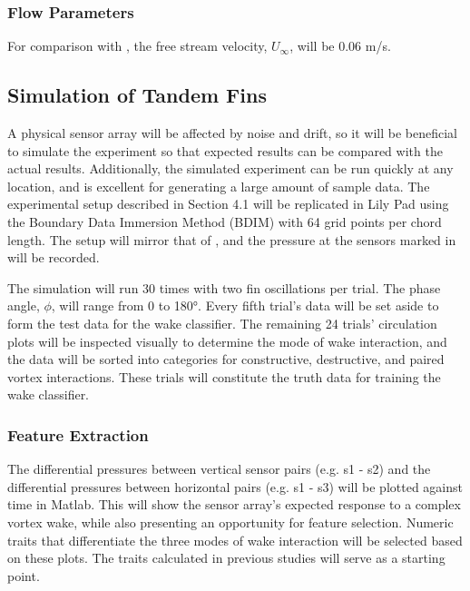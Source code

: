 \subsubsection{Flow Parameters}

    For comparison with \citep{Muscutt2017}, the free stream velocity, \(U_\infty\), will be 0.06 m/s.

\subsection{Simulation of Tandem Fins}

    A physical sensor array will be affected by noise and drift, so it will be beneficial to simulate the experiment so that expected results can be compared with the actual results. Additionally, the simulated experiment can be run quickly at any location, and is excellent for generating a large amount of sample data. The experimental setup described in Section 4.1 will be replicated in Lily Pad using the Boundary Data Immersion Method (BDIM) with 64 grid points per chord length. The setup will mirror that of \citep{Muscutt2017}, and the pressure at the sensors marked in  will be recorded.


    The simulation will run 30 times with two fin oscillations per trial. The phase angle, \(\phi\), will range from 0 to 180°. Every fifth trial's data will be set aside to form the test data for the wake classifier. The remaining 24 trials' circulation plots will be inspected visually to determine the mode of wake interaction, and the data will be sorted into categories for constructive, destructive, and paired vortex interactions. These trials will constitute the truth data for training the wake classifier.

\subsubsection{Feature Extraction}
    
    The differential pressures between vertical sensor pairs (e.g. s1 - s2) and the differential pressures between horizontal pairs (e.g. s1 - s3) will be plotted against time in Matlab. This will show the sensor array's expected response to a complex vortex wake, while also presenting an opportunity for feature selection. Numeric traits that differentiate the three modes of wake interaction will be selected based on these plots. The traits calculated in previous studies will serve as a starting point.
    
